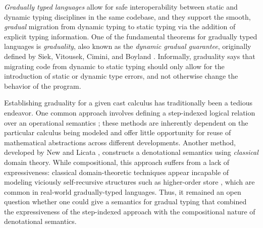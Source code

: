 \documentclass[acmsmall, screen]{acmart}
\theoremstyle{remark}
\begin{document}
\emph{Gradually typed languages} \cite{siek-taha06, tobin-hochstadt06} allow for
safe interoperability between static and dynamic typing disciplines in the same
codebase, and they support the smooth, \emph{gradual} migration from dynamic
typing to static typing via the addition of explicit typing information.
%
%
One of the fundamental theorems for gradually typed languages is
\emph{graduality}, also known as the \emph{dynamic gradual guarantee},
originally defined by Siek, Vitousek, Cimini, and Boyland
\cite{siek_et_al:LIPIcs:2015:5031, new-ahmed2018}.
%
Informally, graduality says that migrating code from dynamic to static typing
should only allow for the introduction of static or dynamic type errors, and not
otherwise change the behavior of the program.
%

Establishing graduality for a given cast calculus has traditionally been a
tedious endeavor. One common approach involves defining a step-indexed logical
relation over an operational semantics \cite{TODO}; these methods are inherently
dependent on the particular calculus being modeled and offer little opportunity
for reuse of mathematical abstractions across different developments. Another
method, developed by New and Licata \cite{new-licata-18}, constructs a
denotational semantics using \emph{classical} domain theory. While
compositional, this approach suffers from a lack of expressiveness: classical
domain-theoretic techniques appear incapable of modeling viciously
self-recursive structures such as higher-order store
\cite{Birkedal-Stovring-Thamsborg-2009}, which are common in real-world
gradually-typed languages.
%
Thus, it remained an open question whether one could give a semantics for
gradual typing that combined the expressiveness of the step-indexed approach
with the compositional nature of denotational semantics.


\end{document}
